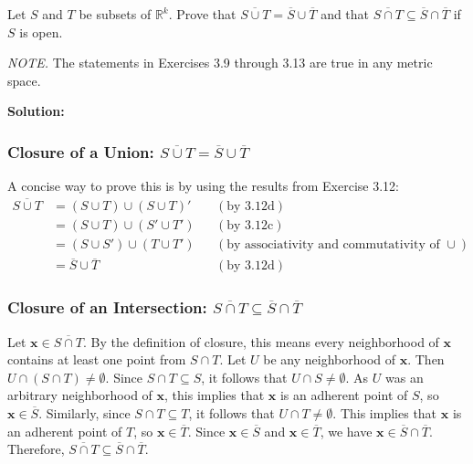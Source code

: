 \begin{problembox}

Let $S$ and $T$ be subsets of $\mathbb{R}^k$. Prove that $\overline{S \cup T} = \overline{S} \cup \overline{T}$ and that $\overline{S \cap T} \subseteq \overline{S} \cap \overline{T}$ if $S$ is open.

\textit{NOTE.} The statements in Exercises 3.9 through 3.13 are true in any metric space.
\end{problembox}

\textbf{Solution:}
\subsubsection*{Closure of a Union: $\overline{S \cup T} = \overline{S} \cup \overline{T}$}
A concise way to prove this is by using the results from Exercise 3.12:
\begin{align*}
\overline{S \cup T} &= (S \cup T) \cup (S \cup T)' && (\text{by 3.12d}) \\
&= (S \cup T) \cup (S' \cup T') && (\text{by 3.12c}) \\
&= (S \cup S') \cup (T \cup T') && (\text{by associativity and commutativity of } \cup) \\
&= \overline{S} \cup \overline{T} && (\text{by 3.12d})
\end{align*}

\subsubsection*{Closure of an Intersection: $\overline{S \cap T} \subseteq \overline{S} \cap \overline{T}$}
Let $\mathbf{x} \in \overline{S \cap T}$. By the definition of closure, this means every neighborhood of $\mathbf{x}$ contains at least one point from $S \cap T$.
Let $U$ be any neighborhood of $\mathbf{x}$. Then $U \cap (S \cap T) \neq \emptyset$.
Since $S \cap T \subseteq S$, it follows that $U \cap S \neq \emptyset$. As $U$ was an arbitrary neighborhood of $\mathbf{x}$, this implies that $\mathbf{x}$ is an adherent point of $S$, so $\mathbf{x} \in \overline{S}$.
Similarly, since $S \cap T \subseteq T$, it follows that $U \cap T \neq \emptyset$. This implies that $\mathbf{x}$ is an adherent point of $T$, so $\mathbf{x} \in \overline{T}$.
Since $\mathbf{x} \in \overline{S}$ and $\mathbf{x} \in \overline{T}$, we have $\mathbf{x} \in \overline{S} \cap \overline{T}$.
Therefore, $\overline{S \cap T} \subseteq \overline{S} \cap \overline{T}$.

